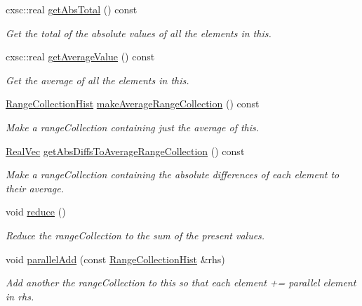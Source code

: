 \begin{DoxyCompactItemize}
cxsc\-::real \hyperlink{classsubpavings_1_1RangeCollectionHist_a551fea530035f92f3a9824d107f7079f}{get\-Abs\-Total} () const 
\begin{DoxyCompactList}\small\item\em \-Get the total of the absolute values of all the elements in this. \end{DoxyCompactList}\item 
cxsc\-::real \hyperlink{classsubpavings_1_1RangeCollectionHist_adb2636c4eb438e5ebbb7cd8be9088af8}{get\-Average\-Value} () const 
\begin{DoxyCompactList}\small\item\em \-Get the average of all the elements in this. \end{DoxyCompactList}\item 
\hyperlink{classsubpavings_1_1RangeCollectionHist}{\-Range\-Collection\-Hist} \hyperlink{classsubpavings_1_1RangeCollectionHist_a3829de1bc59ceff1c9ed143cb05168c2}{make\-Average\-Range\-Collection} () const 
\begin{DoxyCompactList}\small\item\em \-Make a range\-Collection containing just the average of this. \end{DoxyCompactList}\item 
\hyperlink{namespacesubpavings_af2d57bb6e12f4a73169f2e496d6a641f}{\-Real\-Vec} \hyperlink{classsubpavings_1_1RangeCollectionHist_af042b4b68c09ac3b54bcb1abdd51f78c}{get\-Abs\-Diffs\-To\-Average\-Range\-Collection} () const 
\begin{DoxyCompactList}\small\item\em \-Make a range\-Collection containing the absolute differences of each element to their average. \end{DoxyCompactList}\item 
void \hyperlink{classsubpavings_1_1RangeCollectionHist_a7a23ebb0badaa26845d97bfdb3a26dc2}{reduce} ()
\begin{DoxyCompactList}\small\item\em \-Reduce the range\-Collection to the sum of the present values. \end{DoxyCompactList}\item 
void \hyperlink{classsubpavings_1_1RangeCollectionHist_a64e08d8b81255e1fb66fa7f9042f41dd}{parallel\-Add} (const \hyperlink{classsubpavings_1_1RangeCollectionHist}{\-Range\-Collection\-Hist} \&rhs)
\begin{DoxyCompactList}\small\item\em \-Add another the range\-Collection to this so that each element += parallel element in {\itshape rhs\/}. \end{DoxyCompactList}\item 

\end{DoxyCompactItemize}
